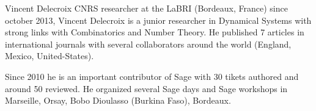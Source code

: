 \begin{participant}[type=leadPI,PM=12,salary=4700,gender=male]{Vincent Delecroix}
CNRS researcher at the LaBRI (Bordeaux, France) since october 2013, Vincent
Delecroix is a junior researcher in Dynamical Systems with strong links with
Combinatorics and Number Theory. He published 7 articles in international
journals with several collaborators around the world (England, Mexico,
United-States).

Since 2010 he is an important contributor of Sage with 30 tikets authored and
around 50 reviewed. He organized several Sage days and Sage workshops in
Marseille, Orsay, Bobo Dioulasso (Burkina Faso), Bordeaux.
\end{participant}

